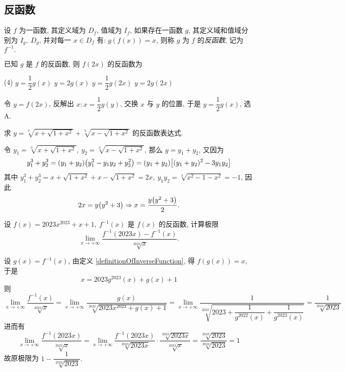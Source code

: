 \subsection{反函数}

\begin{definition}[反函数]
    设 $f$ 为一函数, 其定义域为 $D_f$, 值域为 $I_f$, 如果存在一函数 $g$, 其定义域和值域分别为 $I_g,~D_g$, 并对每一 $x\in D_f$ 有:
    $g(f(x))=x$, 则称 $g$ 为 $f$ 的\textit{反函数}, 记为 $f^{-1}.$
    \label{definitionOfInverseFunction}
\end{definition}

\begin{example}
    已知 $g$ 是 $f$ 的反函数, 则 $f(2x)$ 的反函数为
    \begin{tasks}(4)
        \task $y=\dfrac{1}{2}g(x)$
        \task $y=2g(x)$
        \task $y=\dfrac{1}{2}g(2x)$
        \task $y=2g(2x)$
    \end{tasks}
\end{example}
\begin{solution}
    令 $y=f(2x)$, 反解出 $x:x=\dfrac{1}{2}g(y)$, 交换 $x$ 与 $y$ 的位置, 于是 $y=\dfrac{1}{2}g(x)$, 选 A.
\end{solution}

\begin{example}
    求 $y=\sqrt[3]{x+\sqrt{1+x^{2}}}+\sqrt[3]{x-\sqrt{1+x^{2}}}$ 的反函数表达式.
\end{example}
\begin{solution}
    令 $y_1=\sqrt[3]{x+\sqrt{1+x^{2}}},~y_2=\sqrt[3]{x-\sqrt{1+x^{2}}}$, 那么 $y=y_1+y_2$, 又因为
    $$y_1^3+y_2^3=(y_1+y_2)\qty(y_1^2-y_1y_2+y_2^2)=(y_1+y_2)\qty[(y_1+y_2)^2-3y_1y_2]$$
    其中 $y_1^3+y_2^3=x+\sqrt{1+x^2}+x-\sqrt{1+x^2}=2x,~y_1y_2=\sqrt[3]{x^2-1-x^2}=-1$, 因此 $$2x=y\qty(y^2+3)\Rightarrow x=\dfrac{y\qty(y^2+3)}{2}.$$
\end{solution}

\begin{example}
    设 $f(x)=2023x^{2023}+x+1,~f^{-1}(x)$ 是 $f(x)$ 的反函数, 计算极限 $$\lim_{x\to+\infty}\dfrac{f^{-1}(2023x)-f^{-1}(x)}{\sqrt[2023]{x}}.$$
\end{example}
\begin{solution}
    设 $g(x)=f^{-1}(x)$, 由定义 \ref{definitionOfInverseFunction}, 得 $f(g(x))=x$, 于是 $$x=2023 g^{2023}(x)+g(x)+1$$
    则 $$\lim_{x\to+\infty}\dfrac{f^{-1}(x)}{\sqrt[2023]{x}}=\lim_{x\to+\infty}\dfrac{g(x)}{\sqrt[2023]{2023x^{2023}+g(x)+1}}=\lim_{x\to+\infty}\dfrac{1}{\sqrt[2023]{2023+\dfrac{1}{g^{2022}(x)}+\dfrac{1}{g^{2023}(x)}}}=\dfrac{1}{\sqrt[2023]{2023}}$$
    进而有
    $$\lim_{x\to+\infty}\dfrac{f^{-1}(2023x)}{\sqrt[2023]{x}}=\lim_{x\to+\infty}\dfrac{f^{-1}(2023x)}{\sqrt[2023]{2023x}}\cdot\dfrac{\sqrt[2023]{2023x}}{\sqrt[2023]{x}}=\dfrac{\sqrt[2023]{2023}}{\sqrt[2023]{2023}}=1$$
    故原极限为 $1-\dfrac{1}{\sqrt[2023]{2023}}.$
\end{solution}


